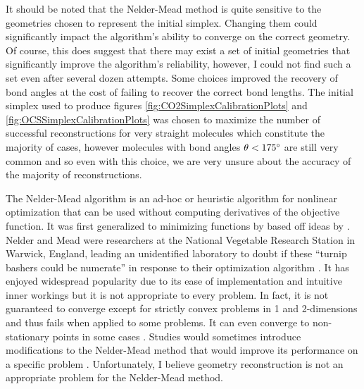 It should be noted that the Nelder-Mead method is quite sensitive to the geometries chosen to represent the initial simplex. Changing them could significantly impact the algorithm's ability to converge on the correct geometry. Of course, this does suggest that there may exist a set of initial geometries that significantly improve the algorithm's reliability, however, I could not find such a set even after several dozen attempts. Some choices improved the recovery of bond angles at the cost of failing to recover the correct bond lengths. The initial simplex used to produce figures \ref{fig:CO2SimplexCalibrationPlots} and \ref{fig:OCSSimplexCalibrationPlots} was chosen to maximize the number of successful reconstructions for very straight molecules which constitute the majority of cases, however molecules with bond angles $\theta < 175\degree$ are still very common and so even with this choice, we are very unsure about the accuracy of the majority of reconstructions.

The Nelder-Mead algorithm is an ad-hoc or heuristic algorithm for nonlinear optimization that can be used without computing derivatives of the objective function\footnotemark. It was first generalized to minimizing functions by \citet{Nelder65} based off ideas by \citet{Spendley62}. Nelder and Mead were researchers at the National Vegetable Research Station in Warwick, England, leading an unidentified laboratory to doubt if these ``turnip bashers could be numerate'' in response to their optimization algorithm \citep{Wright10}. It has enjoyed widespread popularity due to its ease of implementation and intuitive inner workings but it is not appropriate to every problem. In fact, it is not guaranteed to converge except for strictly convex problems in 1 and 2-dimensions \citep{Lagarias98} and thus fails when applied to some problems. It can even converge to non-stationary points in some cases \citep{McKinnon98}. Studies would sometimes introduce modifications to the Nelder-Mead method that would improve its performance on a specific problem \citet{Wright10}. Unfortunately, I believe geometry reconstruction is not an appropriate problem for the Nelder-Mead method.


